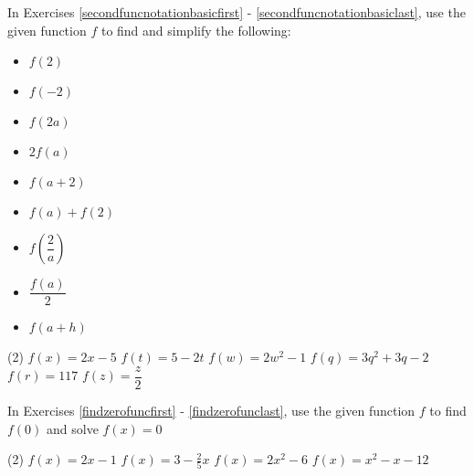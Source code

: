 In Exercises \ref{secondfuncnotationbasicfirst} - \ref{secondfuncnotationbasiclast}, use the given function $f$ to find and simplify the following:

\begin{multicols}{3}
\begin{itemize}

\item  $f(2)$
\item  $f(-2)$
\item  $f(2a)$

\end{itemize}
\end{multicols}

\begin{multicols}{3}
\begin{itemize}

\item  $2 f(a)$
\item $f(a+2)$
\item $f(a) + f(2)$

\end{itemize}
\end{multicols}

\begin{multicols}{3}
\begin{itemize}

\item  $f \left( \dfrac{2}{a} \right)$
\item $\dfrac{f(a)}{2}$
\item  $f(a + h)$

\end{itemize}
\end{multicols}


\begin{tasks}[resume](2)
\task $f(x) = 2x-5$ \label{secondfuncnotationbasicfirst}
\task $f(t) = 5-2t$
\task $f(w) = 2w^2 - 1$
\task $f(q) = 3q^2+3q-2$
\task $f(r) = 117$
\task $f(z) = \dfrac{z}{2}$  \label{secondfuncnotationbasiclast}
\end{tasks}

In Exercises \ref{findzerofuncfirst} - \ref{findzerofunclast}, use the given function $f$ to find $f(0)$ and solve $f(x) = 0$

\begin{tasks}[resume](2)
\task $f(x) = 2x - 1$ \label{findzerofuncfirst}
\task $f(x) = 3 - \frac{2}{5} x$
\task $f(x) = 2x^2 - 6$
\task $f(x) = x^2 - x - 12$ \label{findzerofunclast}
\end{tasks}


